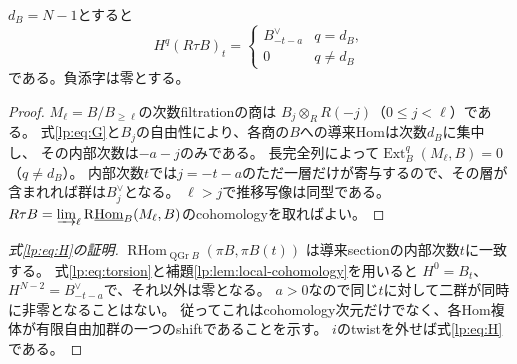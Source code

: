 \begin{lemma}[局所コホモロジーの各次数]\label{lp:lem:local-cohomology}
$d_B=N-1$とすると
\[
 H^q(R\tau B)_t=
 \begin{cases}
  B_{-t-a}^{\vee}&q=d_B,\\
  0&q\ne d_B
 \end{cases}
 \tag{LC'}\label{lp:eq:localcohom}
\]
である。負添字は零とする。
\end{lemma}
\begin{proof}
$M_\ell=B/B_{\ge\ell}$の次数filtrationの商は
$B_j\otimes_R R(-j)$（$0\le j<\ell$）である。
式\eqref{lp:eq:G}と$B_j$の自由性により、各商の$B$への導来Homは次数$d_B$に集中し、
その内部次数は$-a-j$のみである。
長完全列によって$\operatorname{Ext}_B^q(M_\ell,B)=0$（$q\ne d_B$）。
内部次数$t$では$j=-t-a$のただ一層だけが寄与するので、その層が含まれれば群は$B_j^\vee$となる。
$\ell>j$で推移写像は同型である。
$R\tau B=\varinjlim_\ell\operatorname{R\underline{Hom}}_B(M_\ell,B)$のcohomologyを取ればよい。
\end{proof}

\begin{proof}[式\eqref{lp:eq:H}の証明]
$\operatorname{RHom}_{\operatorname{QGr}B}(\pi B,\pi B(t))$
は導来sectionの内部次数$t$に一致する。
式\eqref{lp:eq:torsion}と補題\ref{lp:lem:local-cohomology}を用いると
$H^0=B_t$、$H^{N-2}=B_{-t-a}^\vee$で、それ以外は零となる。
$a>0$なので同じ$t$に対して二群が同時に非零となることはない。
従ってこれはcohomology次元だけでなく、各Hom複体が有限自由加群の一つのshiftであることを示す。
$i$のtwistを外せば式\eqref{lp:eq:H}である。
\end{proof}

